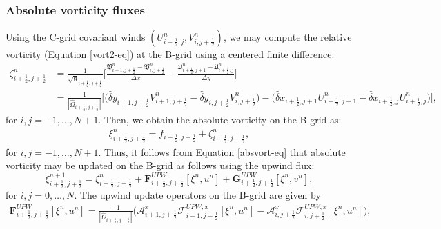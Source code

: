\subsubsection{Absolute vorticity fluxes}
Using the C-grid covariant winds $(U_{i+\frac{1}{2},j}^n,V_{i,j+\frac{1}{2}}^n)$,
we may compute the relative vorticity (Equation \eqref{vort2-eq}) at the B-grid using a centered finite difference:
\begin{align}
	\label{2d-sw-rv-Cgrid}
	\zeta_{i+\frac{1}{2},j+\frac{1}{2}}^n &= \frac{1}{\sqrt{\mathfrak{g}}_{i+\frac{1}{2},j+\frac{1}{2}}}\bigg[
	\frac{\mathfrak{V}_{i+1,j+\frac{1}{2}}^n-\mathfrak{V}_{i,j+\frac{1}{2}}^n}{\Delta x} -
	\frac{\mathfrak{U}_{i+\frac{1}{2},j+1}^n-\mathfrak{U}_{i+\frac{1}{2},j}^n}{\Delta y}
\bigg]\nonumber\\
	&= 
    \frac{1}{|\hat{\Omega}_{i+\frac{1}{2},j+\frac{1}{2}}|}\bigg[
         {\big({\hat{\delta}y_{i+1,j+\frac{1}{2}}{V}_{i+1,j+\frac{1}{2}}^n-
    	   \hat{\delta}y_{i  ,j+\frac{1}{2}}{V}_{i  ,j+\frac{1}{2}}^n}\big)} -
         {\big({\hat{\delta}x_{i+\frac{1}{2},j+1}{U}_{i+\frac{1}{2},j+1}^n-
    	   \hat{\delta}x_{i+\frac{1}{2},j  }{U}_{i+\frac{1}{2},j}^n}\big)}
    \bigg],
\end{align}
for $i,j=-1, \ldots, N+1$.
Then, we obtain the absolute vorticity on the B-grid as:
\begin{align}
	\label{2d-sw-av-Cgrid}
	\xi_{i+\frac{1}{2},j+\frac{1}{2}}^n =
	f_{i+\frac{1}{2},j+\frac{1}{2}} +
	\zeta_{i+\frac{1}{2},j+\frac{1}{2}}^n,
\end{align}
for $i,j=-1, \ldots, N+1$.
Thus, it follows from Equation \eqref{absvort-eq} that absolute vorticity may be updated on the B-grid as follows using the upwind flux:
\begin{equation}
	\label{2d-avort-eq-Cgrid}
	\xi^{n+1}_{i+\frac{1}{2},j+\frac{1}{2}}  =
	\xi^{n}_{i+\frac{1}{2},j+\frac{1}{2}} + 
	\mathbf{F}_{i+\frac{1}{2},j+\frac{1}{2}}^{UPW}[{\xi^n,{u}^{n}}]  + 
	\mathbf{G}_{i+\frac{1}{2},j+\frac{1}{2}}^{UPW}[{\xi^n,{v}^{n}}],
\end{equation}
for $i,j=0, \ldots, N$.
The upwind update operators on the B-grid are given by
\begin{align}
	\mathbf{F}_{i+\frac{1}{2},j+\frac{1}{2}}^{UPW}[{\xi^n,u^{n}}] = 
	\frac{-1}{|\hat{\Omega}_{i+\frac{1}{2},j+\frac{1}{2}}|}
	\bigg(\mathcal{A}_{i+1,j+\frac{1}{2}}^{x} \mathcal{F}_{i+1,j+\frac{1}{2}}^{UPW,x}[\xi^n,{u}^{n}]-
          \mathcal{A}_{i  ,j+\frac{1}{2}}^{x} \mathcal{F}_{i  ,j+\frac{1}{2}}^{UPW,x}[\xi^n,{u}^{n}] \bigg),
\end{align}
